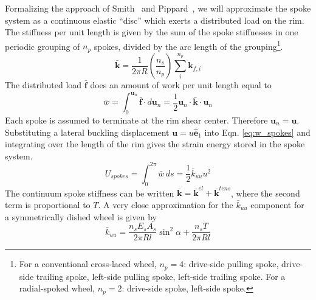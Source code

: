 \documentclass{bmd2016p}
\newcommand{\e}{\ensuremath{\hat{\bm{e}}_1}}
\begin{document}
Formalizing the approach of Smith~\cite{Smith1901a} and Pippard~\cite{Pippard1932d}, we will approximate the spoke system as a continuous elastic ``disc'' which exerts a distributed load on the rim. The stiffness per unit length is given by the sum of the spoke stiffnesses in one periodic grouping of $n_p$ spokes, divided by the arc length of the grouping\footnote{For a conventional cross-laced wheel, $n_p=4$: drive-side pulling spoke, drive-side trailing spoke, left-side pulling spoke, left-side trailing spoke. For a radial-spoked wheel, $n_p=2$: drive-side spoke, left-side spoke.}.
	\begin{equation}\label{eq:kbar}
	\bar{\bm{k}} = \frac{1}{2\pi R}\left(\frac{n_s}{n_p}\right) \sum_i^{n_p} \bm{k}_{f, i}
	\end{equation}
	The distributed load $\bar{\bm{f}}$ does an amount of work per unit length equal to
	\begin{equation}\label{eq:w_spokes}
	\bar{w} = \int_0^{\bm{u}_n} \bar{\bm{f}} \cdot d\bm{u}_n = \frac{1}{2} \bm{u}_n \cdot \bar{\bm{k}} \cdot \bm{u}_n
	\end{equation}
Each spoke is assumed to terminate at the rim shear center. Therefore $\bm{u}_n = \bm{u}$. Substituting a lateral buckling displacement $\bm{u}=u\e$ into Eqn. \ref{eq:w_spokes} and integrating over the length of the rim gives the strain energy stored in the spoke system.
	\begin{equation}\label{eq:Us}
	U_{spokes} = \int_0^{2\pi} \bar{w} \, ds = \frac{1}{2} \bar{k}_{uu}u^2
	\end{equation}
The continuum spoke stiffness can be written $\bar{\bm{k}} = \bar{\bm{k}}^{el} + \bar{\bm{k}}^{tens}$, where the second term is proportional to $T$. A very close approximation for the $\bar{k}_{uu}$ component for a symmetrically dished wheel is given by
	\begin{equation}\label{eq:kuu}
	\bar{k}_{uu} = \frac{n_sE_sA_s}{2\pi Rl}\sin^2{\alpha} + \frac{n_s T}{2\pi Rl}
	\end{equation}
\end{document}
